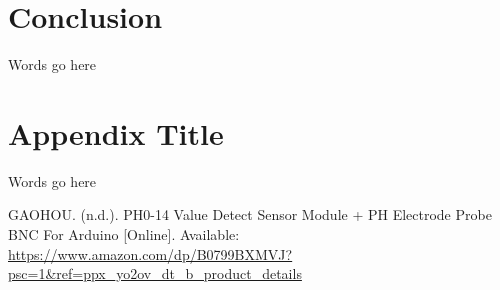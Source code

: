 \documentclass[12pt]{article}
\begin{document}
\section{Conclusion}
\noindent Words go here

\appendix
\section{Appendix Title}
\noindent Words go here

\begin{thebibliography}{99}
     GAOHOU. (n.d.). PH0-14 Value Detect Sensor Module + PH Electrode Probe BNC For Arduino [Online]. Available: \url{https://www.amazon.com/dp/B0799BXMVJ?psc=1&ref=ppx_yo2ov_dt_b_product_details}
\end{thebibliography}
\end{document}
